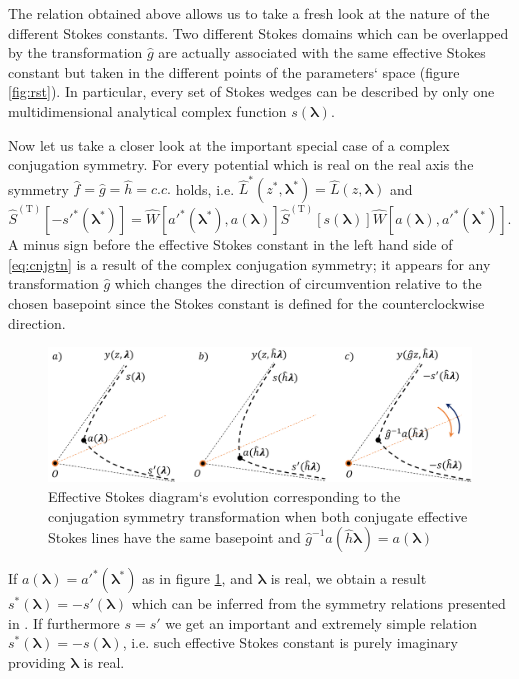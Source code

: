 \documentclass[atmp]{ipart_v1}
\def\LL{\widehat{L}}
\def\lmbd{\bm{\lambda}}
\def\f{\hat{f}}
\def\g{\hat{g}}
\def\h{\hat{h}}
\def\S{\widehat{S}}
\def\W{\widehat{W}}
\def\T{\mathrm{T}}
\newcommand\eref[1]{\eqref{#1}}
\newcommand\fref[1]{figure \ref{#1}}
\begin{document}
The relation obtained above allows us to take a fresh look at the nature of the 
different Stokes constants. Two different Stokes domains which can be overlapped by the 
transformation $\g$ are actually associated with the same effective Stokes constant but 
taken in the different points of the parameters` space (\fref{fig:rst}). In particular, every set of Stokes 
wedges can be described by only one multidimensional analytical complex function $s(\lmbd)$.

Now let us take a closer look at the important special case of a complex conjugation symmetry. 
For every potential which is real on the real axis the symmetry $\f=\g=\h=c.c.$ holds, 
i.e. $\LL^*(z^*,\lmbd^*)=\LL(z,\lmbd)$ and
\begin{equation}
\S^{(\T)} \left[ -s'^*(\lmbd^*) \right] = 
\W \left[ a'^*(\lmbd^*),a(\lmbd) \right]
\S^{(\T)} \left[ s(\lmbd) \right]
\W \left[ a(\lmbd),a'^*(\lmbd^*) \right].
\label{eq:cnjgtn}
\end{equation}
A minus sign before the effective Stokes constant in the left hand side of \eref{eq:cnjgtn} is a result 
of the complex conjugation symmetry; it appears for any transformation $\g$ which changes the direction
of circumvention relative to the chosen basepoint since the Stokes constant is defined for the 
counterclockwise direction.

\begin{figure}
\centering
\noindent
\includegraphics[width=\textwidth]{cs.png}
\caption{Effective Stokes diagram`s evolution corresponding to the conjugation 
symmetry transformation when both conjugate effective Stokes lines have the same 
basepoint and $\g^{-1}a(\h\lmbd)=a(\lmbd)$}
\label{fig:cst}
\end{figure} 

If $a(\lmbd)=a'^*(\lmbd^*)$ as in \fref{fig:cst}, and $\lmbd$ is real, we obtain a result 
$s^*(\lmbd)=-s'(\lmbd)$ which can be inferred from the symmetry relations presented in \cite{symm}. 
If furthermore $s=s'$ we get an important and extremely simple relation $s^*(\lmbd)=-s(\lmbd)$, 
i.e. such effective Stokes constant is purely imaginary providing $\lmbd$ is real.
\end{document}
